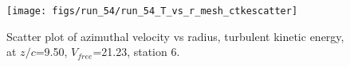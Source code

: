 \begin{figure}[H]
\centering
\texttt{[image: figs/run\_54/run\_54\_T\_vs\_r\_mesh\_ctkescatter]}
\caption{Scatter plot of azimuthal velocity vs radius, turbulent kinetic energy, at $z/c$=9.50, $V_{free}$=21.23, station 6.}
\end{figure}


